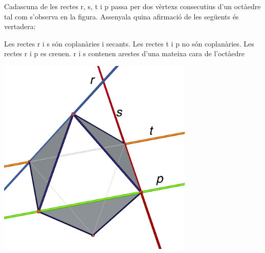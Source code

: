 \newpage
\begin{autoaval}{55}
\begin{mylist}
	
	\vspace{-2.5cm}
	\exer[2] \begin{minipage}[t]{0.6\textwidth}
		Cadascuna de les rectes r, s, t i p passa per dos vèrtexs consecutius d'un octàedre tal com s'observa en la figura. Assenyala quina afirmació de les següents és vertadera:
		
		
		\begin{tasks}
			\task  Les rectes r i s són coplanàries i secants.
			\task  Les rectes t i p no són coplanàries.
			\task  Les rectes r i p es creuen.
			\task  r i s contenen arestes d'una mateixa cara de l'octàedre 
		\end{tasks}
	
	\end{minipage}
	\begin{minipage}{0.4\textwidth}
		\centering
		\vspace{2.5cm}
		\includegraphics[width=0.7\textwidth]{img-11/octaedrerectes}
	\end{minipage}
	




\end{mylist}
\end{autoaval}
